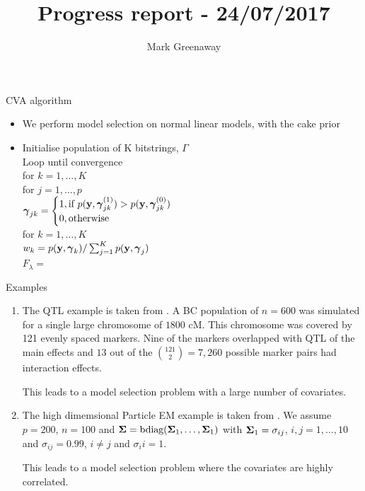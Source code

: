 \documentclass{beamer}
\title{Progress report - 24/07/2017}
\author{Mark Greenaway}
\begin{document}
\begin{frame}
\maketitle
\end{frame}


\begin{frame}{CVA algorithm}
\begin{itemize}
\item We perform model selection on normal linear models, with the cake prior
\item Initialise population of K bitstrings, $\Gamma$ \\
Loop until convergence\\
\quad for $k = 1,  \ldots, K$\\
\quad \quad for $j = 1, \ldots, p$\\
\quad \quad \quad ${\boldsymbol \gamma}_{jk} = \begin{cases}
1, \text{if } p({\bf y}, {\boldsymbol \gamma}_{jk}^{(1)}) > p({\bf y}, {\boldsymbol \gamma}_{jk}^{(0)}) \\
0, \text{otherwise}
\end{cases}$\\
\quad for $k = 1, \ldots, K$\\
\quad \quad $w_k = p({\bf y}, {\boldsymbol \gamma}_k) / \sum_{j=1}^K p({\bf y}, {\boldsymbol \gamma}_j)$\\
\quad \quad $F_\lambda = $
\end{itemize}
\end{frame}


\begin{frame}{Examples}

\begin{enumerate}
\item
The QTL example is taken from \cite{Xu2007}. A BC population of $n=600$ was simulated for a single large
chromosome of $1800$ cM. This chromosome was covered by 121 evenly spaced markers. Nine of the markers
overlapped with QTL of the main effects and $13$ out of the ${121 \choose 2} = 7,260$ possible marker pairs had
interaction effects.

This leads to a model selection problem with a large number of covariates.

\item
The high dimemsional Particle EM example is taken from \cite{Rockova2016}.
We assume $p = 200$, $n = 100$ and ${\boldsymbol \Sigma} = \text{bdiag}({\boldsymbol \Sigma}_1, \ldots, {\boldsymbol \Sigma}_1)$ with
${\boldsymbol \Sigma}_1 = \sigma_{ij}$, $i, j = 1, \ldots, 10$ and $\sigma_{ij} = 0.99$, $i \ne j$ and $\sigma_ii = 1$.

This leads to a model selection problem where the covariates are highly correlated.
\end{enumerate}

\end{frame}
\end{document}

